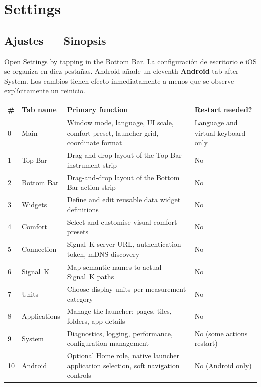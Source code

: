 \part{Settings}

\chapter{Ajustes --- Sinopsis}
\label{ch:settings}

Open Settings by tapping  in the Bottom Bar.
La configuración de escritorio e iOS se organiza en diez pestañas. Android añade un
eleventh \textbf{Android} tab after System.
Los cambios tienen efecto inmediatamente a menos que se observe explícitamente un reinicio.


\begin{longtable}{C{0.6cm}L{3.0cm}L{6.8cm}L{3.3cm}}
\toprule
{}
\color{white}\sffamily\bfseries \# &
\color{white}\sffamily\bfseries Tab name &
\color{white}\sffamily\bfseries Primary function &
\color{white}\sffamily\bfseries Restart needed? \\
 & Main           & Window mode, language, UI scale, comfort preset, launcher grid, coordinate format & Language and virtual keyboard only \\
1 & Top Bar        & Drag-and-drop layout of the Top Bar instrument strip & No \\
2 & Bottom Bar     & Drag-and-drop layout of the Bottom Bar action strip & No \\
3 & Widgets        & Define and edit reusable data widget definitions & No \\
4 & Comfort        & Select and customise visual comfort presets & No \\
5 & Connection     & Signal~K server URL, authentication token, mDNS discovery & No \\
6 & Signal~K       & Map semantic names to actual Signal~K paths & No \\
7 & Units          & Choose display units per measurement category & No \\
8 & Applications   & Manage the launcher: pages, tiles, folders, app details & No \\
9 & System         & Diagnostics, logging, performance, configuration management & No (some actions restart) \\
10 & Android       & Optional Home role, native launcher application selection, soft navigation controls & No (Android only) \\
\bottomrule
\end{longtable}

